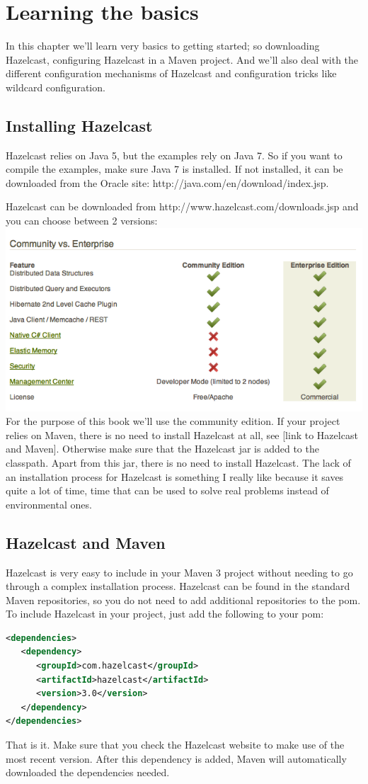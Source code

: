 \chapter{Learning the basics}
In this chapter we'll learn very basics to getting started; so downloading Hazelcast, configuring Hazelcast in a Maven project. And we'll also deal with the different configuration mechanisms of Hazelcast and configuration tricks like wildcard configuration.

\section{Installing Hazelcast}
Hazelcast relies on Java 5, but the examples rely on Java 7. So if you want to compile the examples, make sure Java 7 is installed. If not installed, it can be downloaded from the Oracle site: http://java.com/en/download/index.jsp.

Hazelcast can be downloaded from http://www.hazelcast.com/downloads.jsp and you can choose between 2 versions:
\includegraphics[scale=0.60]{hazelcast-editions.png}
For the purpose of this book we'll use the community edition. If your project relies on Maven, there is no need to install Hazelcast at all, see [link to Hazelcast and Maven]. Otherwise make sure that the Hazelcast jar is added to the classpath. Apart from this jar, there is no need to install Hazelcast.  The lack of an installation process for Hazelcast is something I really like because it saves quite a lot of time, time that can be used to solve real problems instead of environmental ones.

\section{Hazelcast and Maven}
Hazelcast is very easy to include in your Maven 3 project without needing to go through a complex installation process. Hazelcast can be found in the standard Maven repositories, so you do not need to add additional repositories to the pom. To include Hazelcast in your project, just add the following to your pom:
\begin{lstlisting}[language=xml]
<dependencies>	
   <dependency>
      <groupId>com.hazelcast</groupId>
      <artifactId>hazelcast</artifactId>
      <version>3.0</version>
   </dependency>
</dependencies>
\end{lstlisting}
That is it. Make sure that you check the Hazelcast website to make use of the most recent version. After this dependency is added, Maven will automatically downloaded the dependencies needed.

